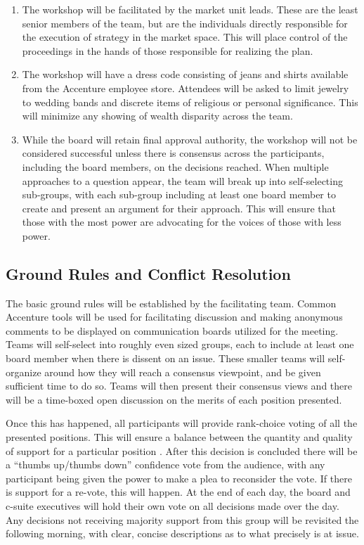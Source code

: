 \begin{enumerate}
  \item{The workshop will be facilitated by the market unit leads. These are the least senior members of the team, but are the individuals directly responsible for the execution of strategy in the market space. This will place control of the proceedings in the hands of those responsible for realizing the plan.}
  \item{The workshop will have a dress code consisting of jeans and shirts available from the Accenture employee store. Attendees will be asked to limit jewelry to wedding bands and discrete items of religious or personal significance. This will minimize any showing of wealth disparity across the team.}
  \item{While the board will retain final approval authority, the workshop will not be considered successful unless there is consensus across the participants, including the board members, on the decisions reached. When multiple approaches to a question appear, the team will break up into self-selecting sub-groups, with each sub-group including at least one board member to create and present an argument for their approach. This will ensure that those with the most power are advocating for the voices of those with less power.}
\end{enumerate}

\subsection{Ground Rules and Conflict Resolution}

The basic ground rules will be established by the facilitating team. Common Accenture tools will be used for facilitating discussion and making anonymous comments to be displayed on communication boards utilized for the meeting. Teams will self-select into roughly even sized groups, each to include at least one board member when there is dissent on an issue. These smaller teams will self-organize around how they will reach a consensus viewpoint, and be given sufficient time to do so. Teams will then present their consensus views and there will be a time-boxed open discussion on the merits of each position presented.

Once this has happened, all participants will provide rank-choice voting of all the presented positions. This will ensure a balance between the quantity and quality of support for a particular position \parencite{merlinCompromiseRulesRevisited2019}. After this decision is concluded there will be a ``thumbs up/thumbs down'' confidence vote from the audience, with any participant being given the power to make a plea to reconsider the vote. If there is support for a re-vote, this will happen. At the end of each day, the board and c-suite executives will hold their own vote on all decisions made over the day. Any decisions not receiving majority support from this group will be revisited the following morning, with clear, concise descriptions as to what precisely is at issue.

